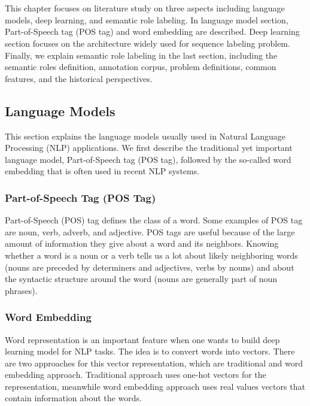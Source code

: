 \chapter{\babDua}
This chapter focuses on literature study on three aspects including language models, deep learning, and semantic role labeling. In language model section, Part-of-Speech tag (POS tag) and word embedding are described. Deep learning section focuses on the architecture widely used for sequence labeling problem. Finally, we explain semantic role labeling in the last section, including the semantic roles definition, annotation corpus, problem definitions, common features, and the historical perspectives.
\section{Language Models}
This section explains the language models usually used in Natural Language Processing (NLP) applications. We first describe the traditional yet important language model, Part-of-Speech tag (POS tag), followed by the so-called word embedding that is often used in recent NLP systems.

\subsection{Part-of-Speech Tag (POS Tag)}
Part-of-Speech (POS) tag defines the class of a word. Some examples of POS tag are noun, verb, adverb, and adjective. POS tags are useful because of the large amount of information they give about a word and
its neighbors. Knowing whether a word is a noun or a verb tells us a lot about likely neighboring words (nouns are preceded by determiners and adjectives, verbs by nouns) and about the syntactic structure around the word (nouns are generally part of noun phrases).

\subsection{Word Embedding}
Word representation is an important feature when one wants to build deep learning model for NLP tasks. The idea is to convert words into vectors. There are two approaches for this vector representation, which are traditional and word embedding approach. Traditional approach uses one-hot vectors for the representation, meanwhile word embedding approach uses real values vectors that contain information about the words.

